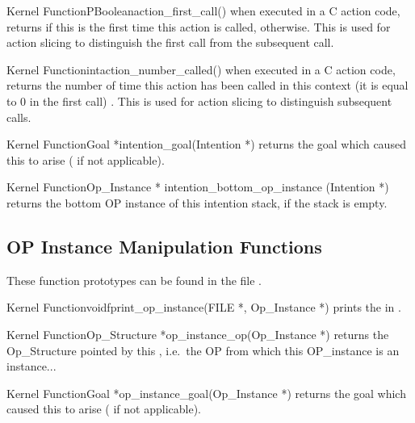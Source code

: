\begin{typefn}{Kernel Function}{PBoolean}{action\_first\_call}{()}
when executed in a C action code, returns  if this is the first time
this action is called,  otherwise. This is used for action slicing
to distinguish the first call from the subsequent call.
\end{typefn}

\begin{typefn}{Kernel Function}{int}{action\_number\_called}{()}
when executed in a C action code, returns the number of time this action has
been called in this context (it is equal to 0 in the first call) . This is used
for action slicing to distinguish subsequent calls.
\end{typefn}

\begin{typefn}{Kernel Function}{Goal *}{intention\_goal}{(Intention
*)} 
returns the goal which caused this  to arise
( if not applicable).
\end{typefn}

\begin{typefn}{Kernel Function}{Op\_Instance *} {intention\_bottom\_op\_instance}
{(Intention *)}
returns the bottom OP instance of this intention stack,
 if the stack is empty.
\end{typefn}

\subsection{OP Instance Manipulation Functions}

These function prototypes can be found in the file
.

\begin{typefn}{Kernel Function}{void}{fprint\_op\_instance}{(FILE *,
Op\_Instance *)}
prints the  in .
\end{typefn}

\begin{typefn}{Kernel Function}{Op\_Structure *}{op\_instance\_op}{(Op\_Instance
*)}
returns the Op\_Structure pointed by this , i.e.\ the OP from
which this OP\_instance is an instance...
\end{typefn}

\begin{typefn}{Kernel Function}{Goal *}{op\_instance\_goal}{(Op\_Instance
*)}
returns the goal which caused this  to arise
( if not applicable).
\end{typefn}

